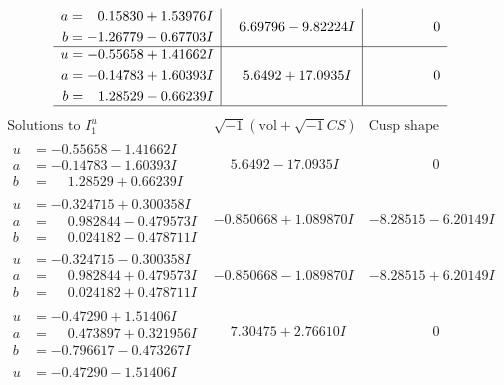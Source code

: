 \documentclass[1p]{elsarticle_modified}
\theoremstyle{definition}
\newcommand{\I}{\sqrt{-1}}
\begin{document}
$$\begin{array}{c|c|c}
\begin{aligned}
a &= \phantom{-}0.15830 + 1.53976 I \\
b &= -1.26779 - 0.67703 I\end{aligned}
 & \phantom{-}6.69796 - 9.82224 I & \phantom{-0.000000 } 0 \\ \hline\begin{aligned}
u &= -0.55658 + 1.41662 I \\
a &= -0.14783 + 1.60393 I \\
b &= \phantom{-}1.28529 - 0.66239 I\end{aligned}
 & \phantom{-}5.6492 + 17.0935 I & \phantom{-0.000000 } 0\\
 \hline 
 \end{array}$$\newpage$$\begin{array}{c|c|c}  
\text{Solutions to }I^u_{1}& \I (\text{vol} + \sqrt{-1}CS) & \text{Cusp shape}\\
 \hline 
\begin{aligned}
u &= -0.55658 - 1.41662 I \\
a &= -0.14783 - 1.60393 I \\
b &= \phantom{-}1.28529 + 0.66239 I\end{aligned}
 & \phantom{-}5.6492 - 17.0935 I & \phantom{-0.000000 } 0 \\ \hline\begin{aligned}
u &= -0.324715 + 0.300358 I \\
a &= \phantom{-}0.982844 - 0.479573 I \\
b &= \phantom{-}0.024182 - 0.478711 I\end{aligned}
 & -0.850668 + 1.089870 I & -8.28515 - 6.20149 I \\ \hline\begin{aligned}
u &= -0.324715 - 0.300358 I \\
a &= \phantom{-}0.982844 + 0.479573 I \\
b &= \phantom{-}0.024182 + 0.478711 I\end{aligned}
 & -0.850668 - 1.089870 I & -8.28515 + 6.20149 I \\ \hline\begin{aligned}
u &= -0.47290 + 1.51406 I \\
a &= \phantom{-}0.473897 + 0.321956 I \\
b &= -0.796617 - 0.473267 I\end{aligned}
 & \phantom{-}7.30475 + 2.76610 I & \phantom{-0.000000 } 0 \\ \hline\begin{aligned}
u &= -0.47290 - 1.51406 I \\

\end{aligned}
\end{array}$$
\end{document}
